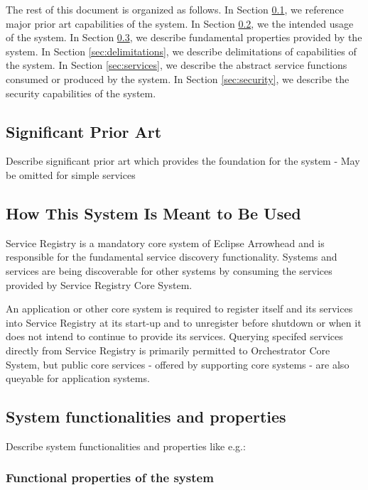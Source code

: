 \documentclass[a4paper]{arrowhead}
\begin{document}
The rest of this document is organized as follows.
In Section \ref{sec:prior_art}, we reference major prior art capabilities
of the system.
In Section \ref{sec:use}, we the intended usage of the system.
In Section \ref{sec:properties}, we describe fundamental properties
provided by the system.
In Section \ref{sec:delimitations}, we describe delimitations of capabilities
of the system.
In Section \ref{sec:services}, we describe the abstract service
functions consumed or produced by the system.
In Section \ref{sec:security}, we describe the security capabilities
of the system.

\newpage

\subsection{Significant Prior Art}
\label{sec:prior_art}

\color{red}
Describe significant prior art which provides the
foundation for the system - May be omitted for simple services
\color{black}  

\subsection{How This System Is Meant to Be Used}
\label{sec:use}

Service Registry is a mandatory core system of Eclipse Arrowhead and is responsible for the fundamental service discovery functionality. Systems and services are being discoverable for other systems by consuming the services provided by Service Registry Core System.

An application or other core system is required to register itself and its services into Service Registry at its start-up and to unregister before shutdown or when it does not intend to continue to provide its services. Querying specifed services directly from Service Registry is primarily permitted to Orchestrator Core System, but public core services - offered by supporting core systems - are also queyable for application systems. 

\subsection{System functionalities and properties}
\label{sec:properties}

\color{red}
Describe system functionalities and properties like e.g.:
\subsubsection {Functional properties of the system}
\end{document}
